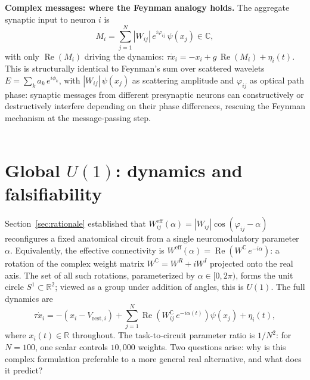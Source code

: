 \documentclass[11pt,a4paper]{article}
\newcommand{\R}{\mathbb{R}}
\newcommand{\C}{\mathbb{C}}
\newcommand{\Weff}{W^{\text{eff}}}
\newcommand{\Wc}{W^{\mathbb{C}}}
\newcommand{\re}{\operatorname{Re}}
\begin{document}
{\\
\\
\textbf{Complex messages: where the Feynman analogy holds.}
The aggregate synaptic input to neuron $i$ is
\begin{equation}
M_i = \sum_{j=1}^{N} |W_{ij}|\,e^{i\varphi_{ij}}\,\psi(x_j) 
\in \C,
\label{eq:complex_message}
\end{equation}
with only $\re(M_i)$ driving the dynamics: 
$\tau\dot{x}_i = -x_i + g\,\re(M_i) + \eta_i(t)$. This is 
structurally identical to Feynman's sum over scattered wavelets 
$E = \sum_k a_k\,e^{i\phi_k}$, with $|W_{ij}|\,\psi(x_j)$ as 
scattering amplitude and $\varphi_{ij}$ as optical path phase: 
synaptic messages from different presynaptic neurons can 
constructively or destructively interfere depending on their 
phase differences, rescuing the Feynman mechanism at the 
message-passing step.
\\
\\

\newpage
\section{Global $U(1)$: dynamics and falsifiability}
\label{sec:u1}

Section~\ref{sec:rationale} established that 
$W_{ij}^{\text{eff}}(\alpha) = |W_{ij}|\cos(\varphi_{ij} - \alpha)$ 
reconfigures a fixed anatomical circuit from a single neuromodulatory 
parameter $\alpha$. Equivalently, the effective connectivity is 
$\Weff(\alpha) = \re(\Wc\, e^{-i\alpha})$: a rotation of the 
complex weight matrix $\Wc = W^R + iW^I$ projected onto the real 
axis. The set of all such rotations, parameterized by $\alpha 
\in [0, 2\pi)$, forms the unit circle $S^1 \subset \R^2$; viewed 
as a group under addition of angles, this is $U(1)$. The full 
dynamics are
\begin{equation}
\tau\dot{x}_i = -(x_i - V_{\text{rest},i}) + \sum_{j=1}^{N} 
\re\!\left(W_{ij}^{\C}\, e^{-i\alpha(t)}\right)\psi(x_j) 
+ \eta_i(t),
\label{eq:u1_dynamics}
\end{equation}
where $x_i(t) \in \R$ throughout. The task-to-circuit parameter 
ratio is $1/N^2$: for $N = 100$, one scalar controls $10{,}000$ 
weights. Two questions arise: why is this complex formulation 
preferable to a more general real alternative, and what does it 
predict?

}
\end{document}
